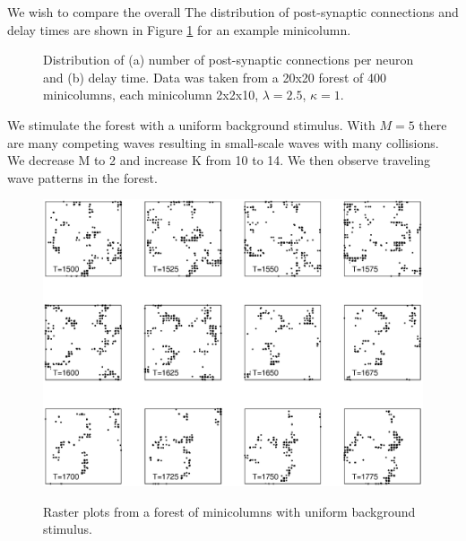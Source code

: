 We wish to compare the overall 
The distribution of post-synaptic connections and delay times are shown in Figure \ref{fig:connection_delay_distrbution_forest} for an example minicolumn.
\begin{figure}[!htb]
 \caption{Distribution of (a) number of post-synaptic connections per neuron and (b) delay time. Data was taken from a 20x20 forest of 400 minicolumns, each minicolumn 2x2x10, $\lambda=2.5$, $\kappa=1$.  } 
 \label{fig:connection_delay_distrbution_forest}
\end{figure}
 \FloatBarrier

We stimulate the forest with a uniform background stimulus. 
With $M=5$ there are many competing waves resulting in small-scale waves with many collisions.
We decrease M to 2 and increase K from 10 to 14.
We then observe traveling wave patterns in the forest.
\begin{figure}[!htb]
 \caption{ Raster plots from a forest of minicolumns with uniform background stimulus.}
   \includegraphics[width=\textwidth]{fig/ForestWaveRaster_Background_K14_M2}
   \label{fig:ForestBackground}
\end{figure}

